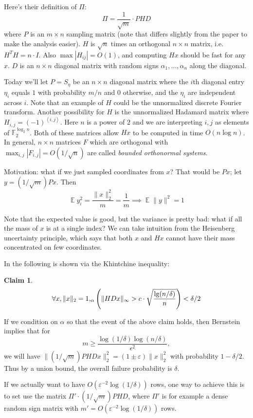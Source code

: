 \documentclass[11pt]{article}
\DeclareMathOperator*{\E}{\mathbb{E}}
\let\Pr\relax
\DeclareMathOperator*{\Pr}{\mathbb{P}}
\newcommand{\eps}{\varepsilon}
\newcommand{\inprod}[1]{\left\langle #1 \right\rangle}
\newcommand{\on}{\operatorname}
\newtheorem{claim}[theorem]{Claim}
\begin{document}
Here's their definition of $\Pi$:
$$\Pi = \frac 1{\sqrt{m}}\cdot PHD$$
where $P$ is an $m \times n$ sampling matrix (note that differs slightly from the paper to make the analysis easier). $H$ is $\sqrt{n}$ times an orthogonal $n \times n$ matrix, i.e.\ $H^TH = n\cdot I$. Also $\on{max}|H_{ij}| = O(1)$, and computing $Hx$ should be fast for any $x$. $D$ is an $n \times n$ diagonal matrix with random signs $\alpha_1,\ldots,\alpha_n$ along the diagonal.

Today we'll let $P = S_\eta$ be an $n\times n$ diagonal matrix where the $i$th diagonal entry $\eta_i$ equals $1$ with probability $m/n$ and $0$ otherwise, and the $\eta_i$ are independent across $i$. Note that an example of $H$ could be the unnormalized discrete Fourier transform. Another possibility for $H$ is the unnormalized Hadamard matrix where $H_{i,j} = (-1)^{\inprod{i,j}}$. Here $n$ is a power of $2$ and we are interpreting $i, j$ as elements of $\mathbb{F}_2^{\log_2 n}$. Both of these matrices allow $Hx$ to be computed in time $O(n\log n)$. In general, $n\times n$ matrices $F$ which are orthogonal with $\max_{i,j} |F_{i,j}| = O(1/\sqrt{n})$ are called {\em bounded orthonormal systems}.

\smallskip

Motivation: what if we just sampled coordinates from $x$? That would be $Px$; let $y = (1/\sqrt{m})Px$. Then
$$\E y_i^2 = \frac{\|x\|_2^2}{m} = \frac{1}{m} \implies \E\|y\|^2 = 1$$

Note that the expected value is good, but the variance is pretty bad: what if all the mass of $x$ is at a single index? We can take intuition from the Heisenberg uncertainty principle, which says that both $x$ and $Hx$ cannot have their mass concentrated on few coordinates.

In \cite{ailon2009fast} the following is shown via the Khintchine inequality:
\begin{claim}
  $$\forall x, \|x\|_2 = 1, \Pr_\alpha\left(\|HDx\|_\infty > c\cdot \sqrt{\frac{\lg(n/\delta)}{n}}\right) < \delta/2$$
\end{claim}

If we condition on $\alpha$ so that the event of the above claim holds, then Bernstein implies that for
  $$m \geq \frac{\log(1/\delta)\log(n/\delta)}{\epsilon^2} ,$$
we will have $\|(1/\sqrt{m}) P H D x\|_2^2 = (1\pm\eps)\|x\|_2^2$ with probability $1-\delta/2$. Thus by a union bound, the overall failure probability is $\delta$.

If we actually want to have $O(\eps^{-2}\log(1/\delta))$ rows, one way to achieve this is to set use the matrix $\Pi' \cdot (1/\sqrt{m}) PHD$, where $\Pi'$ is for example a dense random sign matrix with $m' = O(\eps^{-2}\log(1/\delta))$ rows.
\end{document}
